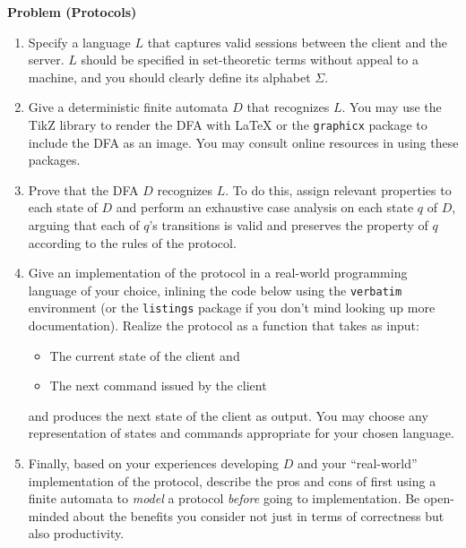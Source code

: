\documentclass[12pt]{article}
\newcounter{ProblemCounter}
\newenvironment{problem}[1][]
  {\refstepcounter{ProblemCounter}\noindent\textbf{Problem \theProblemCounter{} (#1)}\quad}
  {\newpage}
\newcommand{\answerbelow}{\noindent\makebox[\linewidth]{\rule{\textwidth}{0.4pt}}}
\begin{document}
\begin{problem}[Protocols]
\begin{enumerate}[itemsep=0pt, label=(\alph*)]
  \item Specify a language \( L \) that captures valid sessions between the
    client and the server.  \( L \) should be specified in set-theoretic terms
    without appeal to a machine, and you should clearly define its alphabet
    \( \Sigma \).
  \item Give a deterministic finite automata \( D \) that recognizes \( L \).
    You may use the TikZ library to render the DFA with LaTeX or the
    \texttt{graphicx} package to include the DFA as an image.  You may consult
    online resources in using these packages.
  \item Prove that the DFA \( D \) recognizes \( L \).  To do this, assign
    relevant properties to each state of \( D \) and perform an exhaustive case
    analysis on each state \( q \) of \( D \), arguing that each of \( q \)'s
    transitions is valid and preserves the property of \( q \) according to the
    rules of the protocol.
  \item Give an implementation of the protocol in a real-world programming
    language of your choice, inlining the code below using the
    \texttt{verbatim} environment (or the \texttt{listings} package if you
    don't mind looking up more documentation).  Realize the protocol as a
    function that takes as input:
    \begin{itemize}
      \item The current state of the client and
      \item The next command issued by the client
    \end{itemize}
    and produces the next state of the client as output.  You may choose any
    representation of states and commands appropriate for your chosen language.
  \item Finally, based on your experiences developing \( D \) and your
    ``real-world'' implementation of the protocol, describe the pros and cons
    of first using a finite automata to \emph{model} a protocol \emph{before}
    going to implementation.  Be open-minded about the benefits you consider
    not just in terms of correctness but also productivity.
\end{enumerate}

\answerbelow{}


\end{problem}
\end{document}
